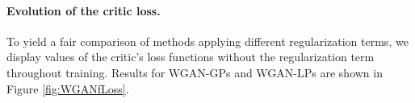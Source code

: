 \documentclass{article} %
\newcommand{\af}[1]{\textcolor{blue}{#1}}
\newcommand{\hp}[1]{\textcolor{red}{#1}}
\begin{document}



\paragraph{Evolution of the critic loss.}

To yield a fair comparison of methods applying different regularization terms, we display values of the critic's loss functions without the regularization term throughout training. 
Results for WGAN-GPs and WGAN-LPs are shown in Figure \ref{fig:WGANfLoss}. 



    
\end{document}
